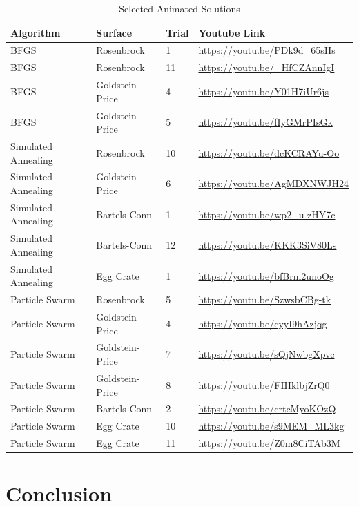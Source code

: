 \documentclass{vgtc}                          %
\begin{document}
\begin{table}[h]
\caption{Selected Animated Solutions}
\label{tab:anim2d_links}
\begin{tabular}{llll}
\toprule
        Algorithm & Surface & Trial & Youtube Link \\
\midrule
        BFGS & Rosenbrock & 1 & \url{https://youtu.be/PDk9d_65sHs} \\
        BFGS & Rosenbrock & 11 & \url{https://youtu.be/_HfCZAnnIgI} \\
        BFGS & Goldstein-Price & 4 & \url{https://youtu.be/Y01H7iUr6js} \\
        BFGS & Goldstein-Price & 5 & \url{https://youtu.be/fIyGMrPIsGk} \\
        Simulated Annealing & Rosenbrock & 10 & \url{https://youtu.be/dcKCRAYu-Oo} \\
        Simulated Annealing & Goldstein-Price & 6 & \url{https://youtu.be/AgMDXNWJH24} \\
        Simulated Annealing & Bartels-Conn & 1 & \url{https://youtu.be/wp2_u-zHY7c} \\
        Simulated Annealing & Bartels-Conn & 12 & \url{https://youtu.be/KKK3SiV80Ls} \\
        Simulated Annealing & Egg Crate & 1 & \url{https://youtu.be/bfBrm2unoOg} \\
        Particle Swarm & Rosenbrock & 5 & \url{https://youtu.be/SzwsbCBg-tk} \\
        Particle Swarm & Goldstein-Price & 4 & \url{https://youtu.be/cyyI9hAzjqg} \\
        Particle Swarm & Goldstein-Price & 7 & \url{https://youtu.be/sQjNwbgXpvc} \\
        Particle Swarm & Goldstein-Price & 8 & \url{https://youtu.be/FIHklbjZrQ0} \\
        Particle Swarm & Bartels-Conn & 2 & \url{https://youtu.be/crtcMyoKOzQ} \\
        Particle Swarm & Egg Crate & 10 & \url{https://youtu.be/s9MEM_ML3kg} \\
        Particle Swarm & Egg Crate & 11 & \url{https://youtu.be/Z0m8CiTAb3M} \\
\bottomrule
\end{tabular}
\end{table}

\section{Conclusion}
\end{document}
